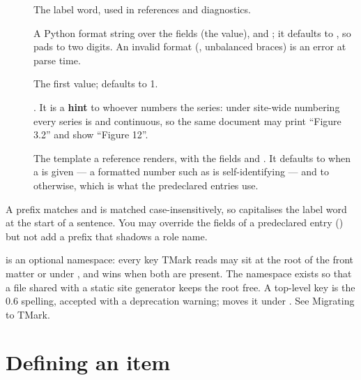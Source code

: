 \documentclass[a4paper,twoside]{article}
\begin{document}
\begin{description}
\item[{}] The label word, used in references and diagnostics.
\item[{}] A Python format string over the fields  (the value),  and
; it defaults to , so  pads to two digits. An
invalid format (, unbalanced braces) is an error at parse time.
\item[{}] The first value; defaults to 1.
\item[{}] . It is a \textbf{hint} to whoever numbers the
series: under site-wide numbering every series is  and
continuous, so the same document may print \enquote{Figure 3.2} and show
\enquote{Figure 12}.
\item[{}] The template a reference renders, with the fields  and .
It defaults to  when a  is given --- a formatted number
such as  is self-identifying --- and to  otherwise,
which is what the predeclared entries use.
\end{description}
A prefix matches  and is matched case-insensitively, so
 capitalises the label word at the start of a sentence. You may
override the fields of a predeclared entry () but not
add a prefix that shadows a role name.
\begin{tscallout}[kind=note, title={\tscodeinline{declare:} may sit at the root}]
 is an optional namespace: every key TMark reads may sit at the root
of the front matter or under , and  wins when both are
present. The namespace exists so that a file shared with a static site
generator keeps the root free. A top-level  key is the 0.6
spelling, accepted with a deprecation warning;  moves it
under . See Migrating to TMark.
\end{tscallout}
\section{Defining an item}
\end{document}
